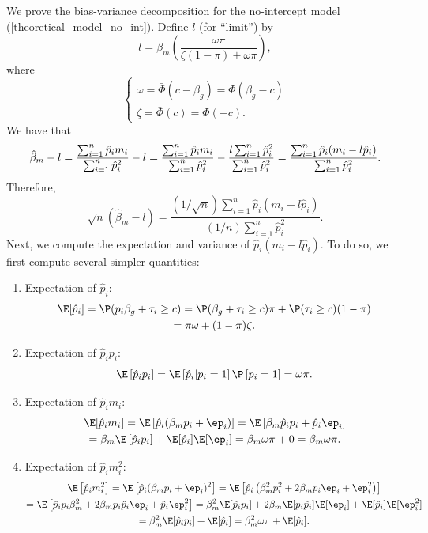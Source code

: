 \documentclass[12pt]{article}
\begin{document}
We prove the bias-variance decomposition for the no-intercept model (\ref{theoretical_model_no_int}). Define $l$ (for ``limit'') by
$$l = \beta_m \left(\frac{\omega \pi}{\zeta(1-\pi) + \omega \pi}\right),$$ where
$$
\begin{cases}
\omega = \bar{\Phi}(c - \beta_g) = \Phi(\beta_g - c) \\
\zeta = \bar{\Phi}(c) = \Phi(-c).
\end{cases}
$$
We have that
\begin{equation*}
\hat{\beta}_m - l = \frac{\sum_{i=1}^n \hat{p}_i m_i}{ \sum_{i=1}^n \hat{p}^2_i} - l = \frac{\sum_{i=1}^n \hat{p}_i m_i}{ \sum_{i=1}^n \hat{p}^2_i} - \frac{l \sum_{i=1}^n \hat{p}_i^2 }{ \sum_{i=1}^n \hat{p}_i^2} \\ = \frac{\sum_{i=1}^n \hat{p}_i(m_i - l \hat{p}_i)}{ \sum_{i=1}^n \hat{p}_i^2}.
\end{equation*}
Therefore,
\begin{equation}\label{bc_decomp_1}
\sqrt{n}(\hat{\beta}_m - l) = \frac{(1/\sqrt{n})\sum_{i=1}^n \hat{p}_i(m_i - l \hat{p}_i)}{(1/n)\sum_{i=1}^n \hat{p}_i^2}.
\end{equation}
Next, we compute the expectation and variance of $\hat{p}_i(m_i - l\hat{p}_i)$. To do so, we first compute several simpler quantities:
\begin{enumerate}
\item Expectation of $\hat{p}_i$: 
\begin{multline*}
\E[\hat{p}_i] = \P(p_i\beta_g + \tau_i \geq c) =  \P(\beta_g + \tau_i \geq c)\pi + \P(\tau_i \geq c)(1-\pi) \\ = \pi \omega + (1-\pi)\zeta.
\end{multline*}
\item Expectation of $\hat{p}_i p_i$: $$\E\left[\hat{p}_i p_i\right] = \E\left[\hat{p}_i | p_i = 1 \right]\P\left[p_i = 1\right] = \omega \pi.$$
\item Expectation of $\hat{p}_i m_i$:
\begin{multline*}
\E[\hat{p}_i m_i] = \E\left[\hat{p}_i(\beta_m p_i + \ep_i)\right] = \E\left[\beta_m \hat{p}_i p_i + \hat{p}_i \ep_i \right] \\ = \beta_m \E\left[ \hat{p}_i p_i \right] + \E[\hat{p}_i]\E[\ep_i] = \beta_m \omega \pi + 0 = \beta_m \omega \pi.
\end{multline*}
\item Expectation of $\hat{p}_i m_i^2$: \begin{multline*}
\E\left[\hat{p}_i m_i^2\right] = \E \left[ \hat{p}_i( \beta_m p_i + \ep_i )^2 \right] = \E\left[ \hat{p}_i \left( \beta_m^2 p_i^2 + 2 \beta_m p_i \ep_i + \ep_i^2 \right)  \right] \\ = \E\left[ \hat{p}_i p_i \beta^2_m + 2 \beta_m p_i \hat{p}_i \ep_i + \hat{p}_i \ep_i^2 \right] = \beta^2_m \E[ \hat{p}_i p_i] + 2 \beta_m \E[p_i\hat{p}_i] \E[\ep_i] + \E[\hat{p}_i] \E[ \ep^2_i ] \\ = \beta^2_m \E[ \hat{p}_i p_i] + \E[\hat{p}_i] = \beta^2_m \omega \pi + \E[ \hat{p}_i]. 
\end{multline*}
\end{enumerate}
\end{document}
